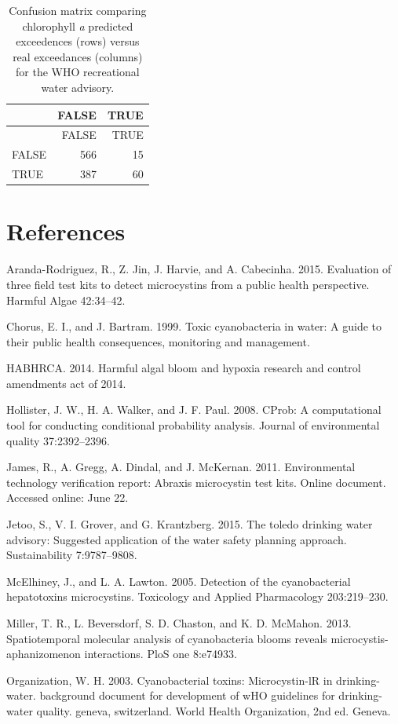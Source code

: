 \documentclass[11pt,]{article}
\begin{document}
\newpage

\begin{longtable}[c]{@{}lrr@{}}
\caption{Confusion matrix comparing chlorophyll \textit{a} predicted
exceedences (rows) versus real exceedances (columns) for the WHO
recreational water advisory.
\label{tab:who_rec_conmat_table}}\tabularnewline
\toprule
& FALSE & TRUE\tabularnewline
\midrule
\endfirsthead
\toprule
& FALSE & TRUE\tabularnewline
\midrule
\endhead
FALSE & 566 & 15\tabularnewline
TRUE & 387 & 60\tabularnewline
\bottomrule
\end{longtable}

\newpage

\section*{References}\label{references}

Aranda-Rodriguez, R., Z. Jin, J. Harvie, and A. Cabecinha. 2015.
Evaluation of three field test kits to detect microcystins from a public
health perspective. Harmful Algae 42:34--42.

Chorus, E. I., and J. Bartram. 1999. Toxic cyanobacteria in water: A
guide to their public health consequences, monitoring and management.

HABHRCA. 2014. Harmful algal bloom and hypoxia research and control
amendments act of 2014.

Hollister, J. W., H. A. Walker, and J. F. Paul. 2008. CProb: A
computational tool for conducting conditional probability analysis.
Journal of environmental quality 37:2392--2396.

James, R., A. Gregg, A. Dindal, and J. McKernan. 2011. Environmental
technology verification report: Abraxis microcystin test kits. Online
document. Accessed online: June 22.

Jetoo, S., V. I. Grover, and G. Krantzberg. 2015. The toledo drinking
water advisory: Suggested application of the water safety planning
approach. Sustainability 7:9787--9808.

McElhiney, J., and L. A. Lawton. 2005. Detection of the cyanobacterial
hepatotoxins microcystins. Toxicology and Applied Pharmacology
203:219--230.

Miller, T. R., L. Beversdorf, S. D. Chaston, and K. D. McMahon. 2013.
Spatiotemporal molecular analysis of cyanobacteria blooms reveals
microcystis-aphanizomenon interactions. PloS one 8:e74933.

Organization, W. H. 2003. Cyanobacterial toxins: Microcystin-lR in
drinking-water. background document for development of wHO guidelines
for drinking-water quality. geneva, switzerland. World Health
Organization, 2nd ed. Geneva.
\end{document}
